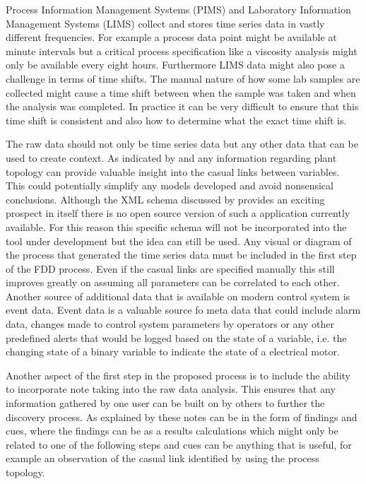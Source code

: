 Process Information Management Systems (PIMS) and Laboratory Information Management Systems (LIMS) collect and stores time series data in vastly different frequencies. For example a process data point might be available at minute intervals but a critical process specification like a viscosity analysis might only be available every eight hours. Furthermore LIMS data might also pose a challenge in terms of time shifts. The manual nature of how some lab samples are collected might cause a time shift between when the sample was taken and when the analysis was completed. In practice it can be very difficult to ensure that this time shift is consistent and also how to determine what the exact time shift is.

The raw data should not only be time series data but any other data that can be used to create context. As indicated by \cite{thornhill2007advances} and \cite{yim2006using} any information regarding plant topology can provide valuable insight into the casual links between variables. This could potentially simplify any models developed and avoid nonsensical conclusions. Although the XML schema discussed by  \cite{thornhill2007advances} provides an exciting prospect in itself there is no open source version of such a application currently available. For this reason this specific schema will not be incorporated into the tool under development but the idea can still be used. Any visual or diagram of the process that generated the time series data must be included in the first step of the FDD process. Even if the casual links are specified manually this still improves greatly on assuming all parameters can be correlated to each other. Another source of additional data that is available on modern control system is event data. Event data is a valuable source fo meta data that could include alarm data, changes made to control system parameters by operators or any other predefined alerts that would be logged based on the state of a variable, i.e. the changing state of a binary variable to indicate the state of a electrical motor.

Another aspect of the first step in the proposed process is to include the ability to incorporate note taking into the raw data analysis. This ensures that any information gathered by one user can be built on by others to further the discovery process. As explained by \cite{mahyar2010closer} these notes can be in the form of findings and cues, where the findings can be as a results calculations which might only be related to one of the following steps and cues can be anything that is useful, for example an observation of the casual link identified by using the process topology.

